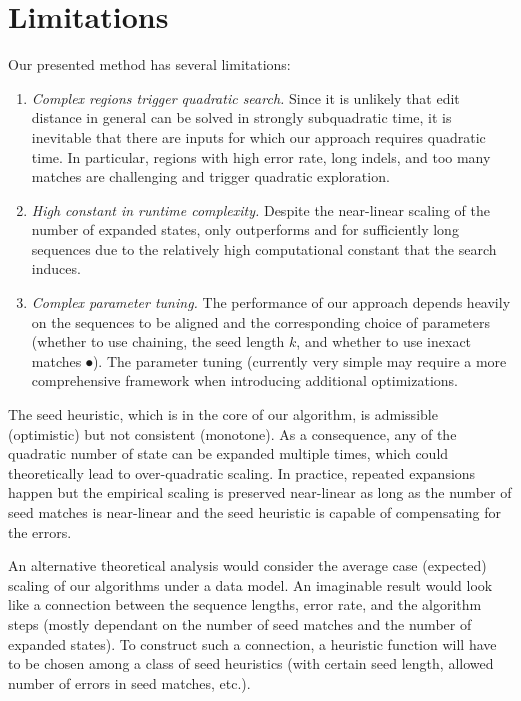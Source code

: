 \section*{Limitations}

Our presented method has several limitations:
\begin{enumerate}
  \item \emph{Complex regions trigger quadratic search.} Since it is unlikely
        that edit distance in general can be solved in strongly subquadratic
        time, it is inevitable that there are inputs for which our approach
        requires quadratic time.  In particular, regions with high error rate,
        long indels, and too many matches are challenging and trigger quadratic
        exploration.
  \item \emph{High constant in runtime complexity.} Despite the near-linear
        scaling of the number of expanded states, \astarpa only outperforms
        \edlib and \wfa for sufficiently long sequences due to the relatively
        high computational constant that the \A search induces.
  \item \emph{Complex parameter tuning.} The performance of our approach depends
        heavily on the sequences to be aligned and the corresponding choice of
        parameters (whether to use chaining, the seed length $k$, and whether to
        use inexact matches $\spot$). The parameter tuning (currently very
        simple may require a more comprehensive framework when introducing
        additional optimizations.
\end{enumerate}

The seed heuristic, which is in the core of our \A algorithm, is admissible
(optimistic) but not consistent (monotone). As a consequence, any of the
quadratic number of state can be expanded multiple times, which could
theoretically lead to over-quadratic scaling. In practice, repeated expansions
happen but the empirical scaling is preserved near-linear as long as the number
of seed matches is near-linear and the seed heuristic is capable of compensating
for the errors.

An alternative theoretical analysis would consider the average case (expected)
scaling of our algorithms under a data model. An imaginable result would look
like a connection between the sequence lengths, error rate, and the algorithm
steps (mostly dependant on the number of seed matches and the number of expanded
states). To construct such a connection, a heuristic function will have to be
chosen among a class of seed heuristics (\AG with certain seed length, allowed
number of errors in seed matches, etc.).
